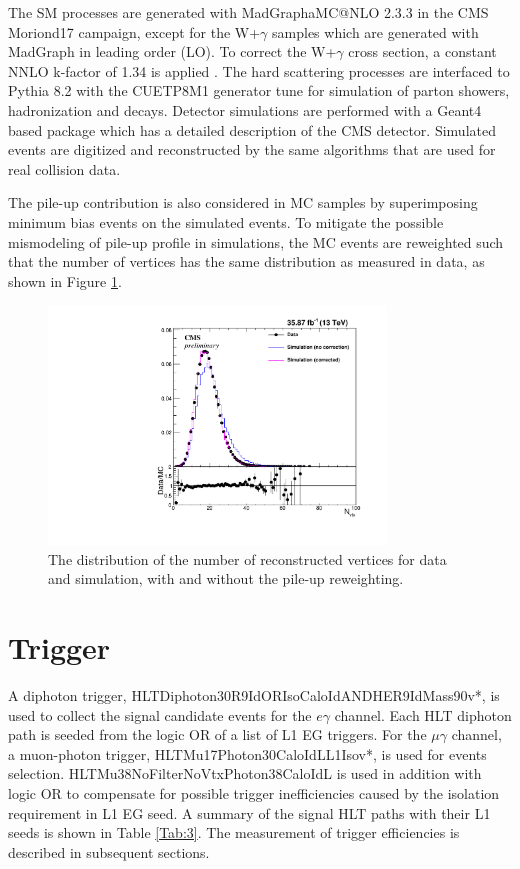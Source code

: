 \documentclass[thesis.tex]{subfiles}
\renewcommand\_{\textunderscore\allowbreak}
\begin{document}
The SM processes are generated with MadGraph\_aMC@NLO 2.3.3 in the CMS Moriond17 campaign, except for the W+$\gamma$ samples which are generated with MadGraph in leading order (LO). 
To correct the W+$\gamma$ cross section, a constant NNLO k-factor of 1.34 is applied \cite{K:MonoPho, K:Bozzi}. 
The hard scattering processes  are interfaced to Pythia 8.2 with the CUETP8M1 generator tune for simulation of parton showers,  hadronization and decays. 
Detector simulations are performed with a Geant4 based package which has a detailed description of the CMS detector. 
Simulated events are digitized and reconstructed by the same algorithms that are used for real collision data. 

The pile-up contribution is also considered in MC samples by superimposing minimum bias events on the simulated events. 
To mitigate the possible mismodeling of pile-up profile in simulations, the MC events are reweighted such that the number of vertices has the same distribution as measured in data, as shown in Figure \ref{fig:PUreweight}.

\begin{figure}[h]
  \centering
    \includegraphics[width=0.8\textwidth]{Figures/PLOT_PUreweight.pdf}
  \caption{The distribution of the number of reconstructed vertices for data and simulation, with and without the pile-up reweighting.}
  \label{fig:PUreweight}
\end{figure}


\section{Trigger}
\label{subsec:trigger}
A diphoton trigger, HLT\_Diphoton30\_18\_R9Id\_OR\_IsoCaloId\_AND\_HE\_R9Id\_Mass90\_v*, is used to collect the signal candidate events for the $e\gamma$ channel. Each HLT diphoton path is seeded from the logic OR of a list of L1 EG triggers.
For the $\mu\gamma$ channel, a muon-photon trigger, HLT\_Mu17\_Photon30\_CaloIdL\_L1Iso\_v*, is used for events selection. 
HLT\_Mu38NoFilterNoVtx\_Photon38\_CaloIdL is used in addition with logic OR to compensate for possible trigger inefficiencies caused by the isolation requirement in L1 EG seed. 
A summary of the signal HLT paths with their L1 seeds is shown in Table \ref{Tab:3}. 
The measurement of trigger efficiencies is described in subsequent sections. \\
\end{document}
